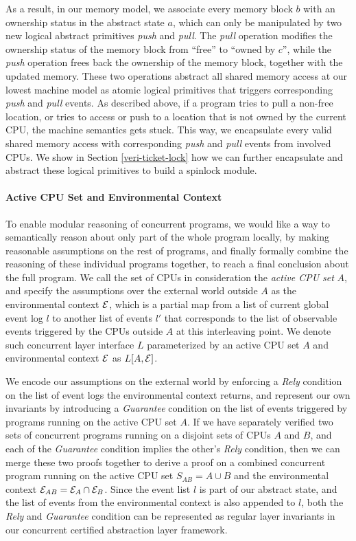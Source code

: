 As a result, in our memory model, we associate every memory block $b$ with
an ownership status in the abstract state $a$, which can only be manipulated
by two new logical abstract primitives \emph{push} and \emph{pull}.
The \emph{pull} operation modifies the ownership status of the memory block
from ``free'' to ``owned by $c$'', while the \emph{push} operation frees back
the ownership of the memory block, together with the updated memory.
These two operations abstract all shared memory access at our
lowest machine model as atomic logical primitives that triggers corresponding
\emph{push} and \emph{pull} events. 
As described above, if a program tries to pull a non-free location, or tries to
access or push to a location that is not owned by the current CPU, the
machine semantics gets stuck. 
This way, we encapsulate every valid shared memory access with corresponding
\emph{push} and \emph{pull} events from involved CPUs.
We show in Section \ref{veri-ticket-lock}
how we can further encapsulate and abstract these logical primitives to
build a spinlock module.


\paragraph{Active CPU Set and Environmental Context}
To enable modular reasoning of concurrent programs, we would like a way
to semantically reason about only part of the whole program locally, by
making reasonable assumptions on the rest of programs, and finally formally
combine the reasoning of these individual programs together, to reach a
final conclusion about the full program.
We call the set of CPUs in consideration the \emph{active CPU set} $A$, and
specify the assumptions over the external world outside $A$ as the
environmental context $\mathcal{E}$, which is a partial map from a list of
current global event log $l$ to another list of events $l'$ that corresponds
to the list of observable events triggered by the CPUs outside $A$ at this
interleaving point. We denote such concurrent layer interface $L$ parameterized by
an active CPU set $A$ and environmental context $\mathcal{E}$ as
$L[A,\mathcal{E}]$.

We encode our assumptions on the external world by
enforcing a \emph{Rely} condition on the list of event logs
the environmental context returns,
and represent our own invariants by introducing a \emph{Guarantee} condition
on the list of events triggered by programs running on the active CPU set $A$.
If we have separately verified two sets of concurrent programs running on
a disjoint sets of CPUs $A$ and $B$, and each of the \emph{Guarantee} condition
implies the other's \emph{Rely} condition, then we can merge these two proofs
together to derive a proof on a combined concurrent program running on the
active CPU set $S_{AB}=A\cup B$ and the environmental context 
$\mathcal{E}_{AB}=\mathcal{E}_A\cap\mathcal{E}_B$.
Since the event list $l$ is part of our abstract state, and the list of events
from the environmental context is also appended to $l$, both the \emph{Rely}
and \emph{Guarantee} condition can be represented as regular layer invariants
in our concurrent certified abstraction layer framework.

